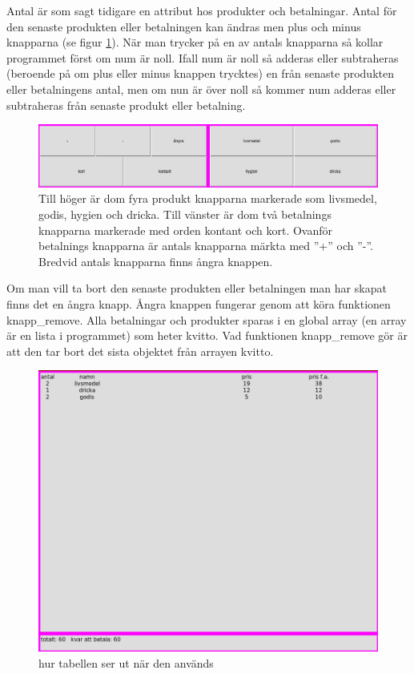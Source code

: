\documentclass[a4paper, 12pt]{article}
\begin{document}
Antal är som sagt tidigare en attribut hos produkter och betalningar. Antal för den senaste produkten eller betalningen kan ändras men plus och minus knapparna (se figur \ref{fig:3alt}).
När man trycker på en av antals knapparna så kollar programmet först om num är noll. Ifall num är noll så adderas eller subtraheras (beroende på om plus eller minus knappen trycktes) en från senaste produkten eller betalningens antal, men om nun är över noll så kommer num adderas eller subtraheras från senaste produkt eller betalning. 


\begin{figure}[h!]
  \includegraphics[width=\linewidth]{img/3alt.png}
  \caption{
	  Till höger är dom fyra produkt knapparna markerade som livsmedel, godis, hygien och dricka.
	  Till vänster är dom två betalnings knapparna markerade med orden kontant och kort.
	  Ovanför betalnings knapparna är antals knapparna märkta med ''+'' och ''-''.
	  Bredvid antals knapparna finns ångra knappen. 
	}
  \label{fig:3alt}
\end{figure}


Om man vill ta bort den senaste produkten eller betalningen man har skapat finns det en ångra knapp.
Ångra knappen fungerar genom att köra funktionen knapp\_remove. 
Alla betalningar och produkter sparas i en global array (en array är en lista i programmet) som heter kvitto. Vad funktionen knapp\_remove gör är att den tar bort det sista objektet från arrayen kvitto.

\begin{figure}[t!]
  \includegraphics[width=\linewidth]{img/kvitto_disp.png}
  \caption{ hur tabellen ser ut när den används}
  \label{fig:kdisp}
\end{figure}
\end{document}
